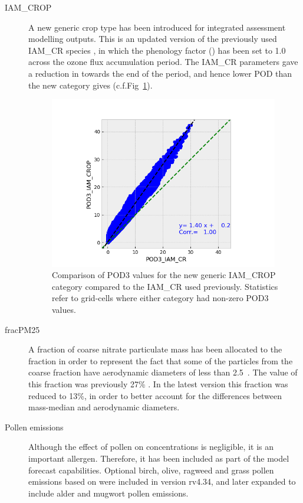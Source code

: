 \begin{description}

  \item[IAM\_CROP] A new generic crop type has been introduced for integrated assessment modelling outputs. This is an updated version of the previously used IAM\_CR species \citep{Simpson:EMEP2012}, in which the phenology factor (\fphen) has been set to 1.0 across the ozone flux accumulation period. The IAM\_CR parameters gave a reduction in \fphen towards the end of the period, and hence lower POD than the new category gives (c.f.Fig~\ref{fig:PODcomp}).
 
 \begin{figure}
  \centering
    \includegraphics*[width=10cm]{FIGS_UPDATES/PlotIAMpods.png}
  \parbox{10cm}{
  \caption{Comparison of POD3 values for the new generic IAM\_CROP category compared to the IAM\_CR used previously. Statistics refer to grid-cells where either category had non-zero POD3 values.
    \label{fig:PODcomp}}
  }
\end{figure}
 
    \item[fracPM25] A fraction of coarse nitrate particulate mass has been allocated to the \PM[2.5] fraction in order to represent the fact that some of the particles from the coarse fraction have aerodynamic diameters of less than 2.5~\um. The value of this fraction was previously 27\% \citep{Simpson:EMEP2012}. In the latest version this fraction was reduced to 13\%, in order to better account for the differences between mass-median and aerodynamic diameters.
  
  \item[Pollen emissions] Although the effect of pollen on \PM[2.5] concentrations is negligible, it is an important allergen. Therefore, it has been included as part of the model forecast capabilities. Optional birch, olive, ragweed and grass pollen emissions based on \citet{Sofiev-2015,Sofiev-2017} were included in version rv4.34, and later expanded to include alder and mugwort pollen emissions. 
  

\end{description}
